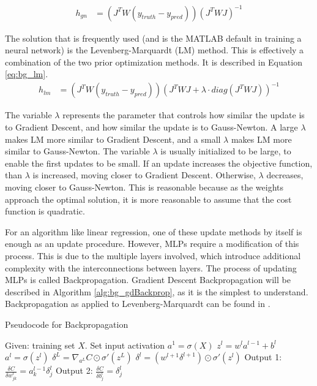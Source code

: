 	\begin{align}
		h_{gn} &= (J^TW(y_{truth}-y_{pred}))(J^T WJ)^{-1} \label{eq:bg_gaussNewton}
	\end{align}
	\par The solution that is frequently used (and is the MATLAB default in training a neural network) is the Levenberg-Marquardt (LM) method\cite{lm_alg}. This is effectively a combination of the two prior optimization methods. It is described in Equation \ref{eq:bg_lm}. 
	\begin{align}
		h_{lm} &= (J^TW(y_{truth}-y_{pred}))(J^T WJ + \lambda \cdot diag(J^T WJ))^{-1} \label{eq:bg_lm}
	\end{align}
	\par The variable $\lambda$ represents the parameter that controls how similar the update is to Gradient Descent, and how similar the update is to Gauss-Newton. A large $\lambda$ makes LM more similar to Gradient Descent, and a small $\lambda$ makes LM more similar to Gauss-Newton. The variable $\lambda$ is usually initialized to be large, to enable the first updates to be small. If an update increases the objective function, than $\lambda$ is increased, moving closer to Gradient Descent. Otherwise, $\lambda$ decreases, moving closer to Gauss-Newton. This is reasonable because as the weights approach the optimal solution, it is more reasonable to assume that the cost function is quadratic.
	\par For an algorithm like linear regression, one of these update methods by itself is enough as an update procedure. However, MLPs require a modification of this process. This is due to the multiple layers involved, which introduce additional complexity with the interconnections between layers. The process of updating MLPs is called Backpropagation. Gradient Descent Backpropagation will be described in Algorithm \ref{alg:bg_gdBackprop}, as it is the simplest to understand. Backpropagation as applied to Levenberg-Marquardt can be found in \cite{LM_training}.
	\begin{algorithm}
		\caption{Pseudocode for Backpropagation}
		\label{alg:bg_gdBackprop}
		\begin{algorithmic}[1]
			\State Given: training set $X$.
			\State Set input activation $a^1=\sigma(X)$
			\State $z^l = w^l a^{l-1} +b^l$
			\State $a^l = \sigma(z^l)$ 
			\EndFor
			\State $\delta^L = \nabla_{a^L} C \odot \sigma '(z^L)$
			\State $\delta^l = (w^{l+1}\delta^{l+1}) \odot \sigma '(z^l)$
			\EndFor
			\State Output 1: $\frac{\delta C}{\delta w^{l}_{jk}} = a^{l-1}_{k}\delta^{l}_{j}$
			\State Output 2: $\frac{\delta C}{\delta b^{l}_{j}} = \delta^{l}_{j}$
			\EndProcedure
		\end{algorithmic}
	\end{algorithm}
